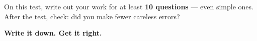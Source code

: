 {\begin{tcolorbox}[
    enhanced,
    colback=funYellowLight,
    colframe=funYellow!60,
    arc=10pt,
    boxrule=1pt,
    left=6mm, right=6mm, top=4mm, bottom=4mm,
]
\vspace{2mm}

On this test, write out your work for at least \textbf{10 questions} — even simple ones. After the test, check: did you make fewer careless errors?
\end{tcolorbox}

\vspace{4mm}

\begin{center}
{\large\bfseries\color{funTealDark} \faPen\hspace{2mm}Write it down. Get it right.\hspace{2mm}\faPen}
\end{center}

}
\newpage
